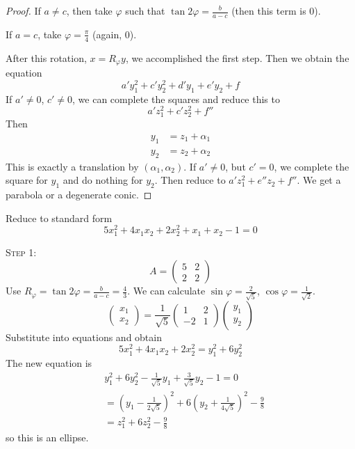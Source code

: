 \documentclass[10pt]{scrartcl}
\begin{document}
\begin{proof}
If $a \neq c$, then take $\varphi$ such that $\tan2\varphi = \frac{b}{a-c}$ (then this term is $0$). 

If $a = c$, take $\varphi = \frac{\pi}{4}$ (again, $0$). 

After this rotation, $x = R_\varphi y$, we accomplished the first step. Then we obtain the equation
\[
  a'y_1^2 + c'y_2^2 + d'y_1 + e'y_2 + f
\]
If $a'\neq 0$, $c' \neq 0$, we can complete the squares and reduce this to 
\[
  a'z_1^2 + c'z_2^2 + f''
\]
Then
\begin{align*}
  y_1 &= z_1 + \alpha_1\\
  y_2 &= z_2 + \alpha_2
\end{align*}
This is exactly a translation by $(\alpha_1,\alpha_2)$. If $a'\neq 0$, but $c' = 0$, we complete the square for $y_1$ and do nothing for $y_2$. Then reduce to $a'z_1^2 + e''z_2 + f''$. We get a parabola or a degenerate conic. 
\end{proof}\vsp


\begin{example} Reduce to standard form 
\[
  5x_1^2 + 4x_1x_2 + 2x_2^2 + x_1 + x_2 - 1 = 0
\]


\textsc{Step 1:} 
\[
  A = \begin{pmatrix}
	5 & 2 \\ 2 & 2 	
 \end{pmatrix}
\]
Use $R_\varphi = \tan2\varphi =  \frac{b}{a-c} = \frac{4}{3}$. We can calculate $\sin\varphi = \frac{2}{\sqrt{5}}$, $\cos\varphi = \frac{1}{\sqrt{2}}$. 
\[
  \begin{pmatrix}
  x_1 \\ x_2	
  \end{pmatrix} 
  = \frac{1}{\sqrt{5}}
  \begin{pmatrix}
  1 & 2 \\ -2 & 1	
  \end{pmatrix}\begin{pmatrix}
 y_1\\ y_2	
\end{pmatrix}
\]
Substitute into equations and obtain 
\[
  5x_1^2 + 4x_1x_2 + 2x_2^2 = y_1^2 + 6y_2^2
\]
The new equation is 
\begin{align*}
&y_1^2 + 6y_2^2 - \frac{1}{\sqrt{5}}y_1 + \frac{3}{\sqrt{5}}y_2 - 1 = 0\\
&= (y_1 - \frac{1}{2\sqrt{5}})^2 + 6(y_2 + \frac{1}{4\sqrt{5}})^2 - \frac{9}{8}\\
&= z_1^2 + 6z_2^2 - \frac{9}{8}  
\end{align*}
so this is an ellipse.
\end{example}\vsp 
\end{document}
